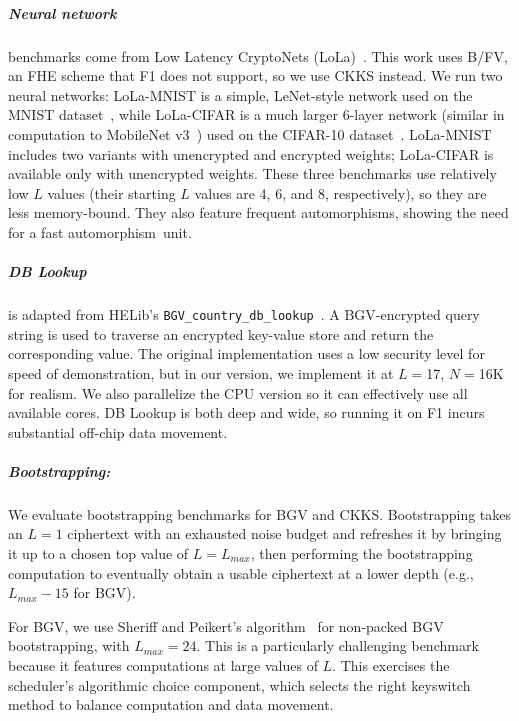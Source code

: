 \subparagraph{Neural network} benchmarks come from Low Latency CryptoNets (LoLa)~\cite{brutzkus:icml19:low}.
This work uses B/FV, an FHE scheme that F1 does not support, so we use CKKS instead.
We run two neural networks:
LoLa-MNIST is a simple, LeNet-style network used on the MNIST dataset~\cite{lecunn:ieee98:gradient-document},
while LoLa-CIFAR is a much larger 6-layer network (similar in computation to MobileNet v3~\cite{howard2019searching})
used on the CIFAR-10 dataset~\cite{cifar10}.
LoLa-MNIST includes two variants with unencrypted and encrypted weights;
LoLa-CIFAR is available only with unencrypted weights.
These three benchmarks use relatively low $L$ values (their starting $L$ values are 4, 6, and 8, respectively),
so they are less memory-bound.
They also feature frequent automorphisms,
showing the need for a fast automorphism~unit.


\tblFOneGF %

\subparagraph{DB Lookup} is adapted from HELib's \texttt{BGV\_country\_db\_lookup}~\cite{helib:db-lookup}. A BGV-encrypted query string is used to traverse an encrypted key-value store and return the corresponding value. The original implementation uses a low security level for speed of demonstration, but in our version, we implement it at $L=$17, $N=$16K for realism. We also parallelize the CPU version so it can effectively use all available cores. DB Lookup is both deep and wide, so running it on F1 incurs substantial off-chip data movement.

\addtocounter{table}{1}
\tblFOneMicrobenchmark

\subparagraph{Bootstrapping:} We evaluate bootstrapping benchmarks for BGV and CKKS.
Bootstrapping takes an $L=1$ ciphertext with an exhausted noise budget and refreshes it
by bringing it up to a chosen top value of $L=L_{max}$, then performing the bootstrapping computation
to eventually obtain a usable ciphertext at a lower depth (e.g., $L_{max} - 15$ for BGV).

For BGV, we use Sheriff and Peikert's algorithm~\cite{alperin:crypto13:practical} for non-packed BGV boot\-strap\-ping, with $L_{max} = 24$.
This is a particularly challenging benchmark because it features computations at large values of $L$.
This exercises the scheduler's 
algorithmic choice component, which selects
the right keyswitch method to balance computation and data movement.


